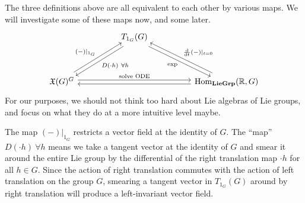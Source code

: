 \documentclass[../../rtnotes.tex]{subfiles}
\begin{document}
The three definitions above are all equivalent to each other by various maps. We will investigate some of these maps now, and some later. 
\[\begin{tikzcd}[ampersand replacement=\&]
	\&\& {T_{1_G}(G)} \\
	\\
	{\mathfrak X(G)^G} \&\&\&\& {\Hom_{\LieGrp}(\mathbb R,G)}
	\arrow["{D(\cdot h)~\forall h}", shift left, from=1-3, to=3-1]
	\arrow["\exp"', shift right, from=1-3, to=3-5]
	\arrow["{(-)|_{1_G}}", shift left, from=3-1, to=1-3]
	\arrow["{\text{solve ODE}}", shift left, from=3-1, to=3-5]
	\arrow["{\dv{t}(-)|_{t=0}}"', shift right, from=3-5, to=1-3]
	\arrow[shift left, from=3-5, to=3-1]
\end{tikzcd}\]
For our purposes, we should not think too hard about Lie algebras of Lie groups, and focus on what they do at a more intuitive level maybe.

The map $(-)|_{1_G}$ restricts a vector field at the identity of $G$. The ``map'' $D(\cdot h)~\forall h$ means we take a tangent vector at the identity of $G$ and smear it around the entire Lie group by the differential of the right translation map $\cdot h$ for all $h\in G$. Since the action of right translation commutes with the action of left translation on the group $G$, smearing a tangent vector in $T_{1_G}(G)$ around by right translation will produce a left-invariant vector field.
\end{document}
